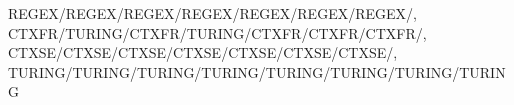 REGEX/REGEX/REGEX/REGEX/REGEX/REGEX/REGEX/,
CTXFR/TURING/CTXFR/TURING/CTXFR/CTXFR/CTXFR/,
CTXSE/CTXSE/CTXSE/CTXSE/CTXSE/CTXSE/CTXSE/,
TURING/TURING/TURING/TURING/TURING/TURING/TURING/TURING